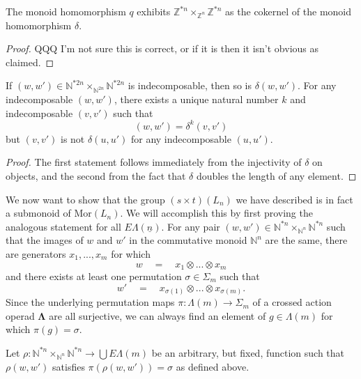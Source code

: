 \documentclass{amsbook} %
\newcommand{\ML}{\mathbf{\Lambda}}
\newcommand{\MorLn}{\mathrm{Mor}(L_n)}
\newcommand{\EL}{E\Lambda}
\newcommand{\ELn}{E\Lambda(\underline{n})}
\numberwithin{section}{chapter}
\begin{document}
\begin{lem}\label{monoid_coeq}
The monoid homomorphism $q$ exhibits $\mathbb{Z}^{\ast n} \times_{\mathbb{Z}^n} \mathbb{Z}^{\ast n}$ as the cokernel of the monoid homomorphism $\delta$.
\end{lem}
\begin{proof}
QQQ I'm not sure this is correct, or if it is then it isn't obvious as claimed.
\end{proof}

\begin{lem}\label{rho_lemmas}
If $(w,w') \in \mathbb{N}^{\ast 2n} \times_{\mathbb{N}^{2n}} \mathbb{N}^{\ast 2n}$ is indecomposable, then so is $\delta(w,w')$. For any indecomposable $(w,w')$, there exists a unique natural number $k$ and indecomposable $(v,v')$ such that
\[
(w,w') = \delta^k(v,v')
\]
but $(v,v')$ is not $\delta(u,u')$ for any indecomposable $(u,u')$.
\end{lem}
\begin{proof}
The first statement follows immediately from the injectivity of $\delta$ on objects, and the second from the fact that $\delta$ doubles the length of any element.
\end{proof}


We now want to show that the group $(s \times t)(L_n)$ we have described is in fact a submonoid of $\MorLn$.  We will accomplish this  by first proving the analogous statement for all $\ELn$.  For any pair $(w, w') \in \mathbb{N}^{\ast n} \times_{\mathbb{N}^n} \mathbb{N}^{\ast n}$ such that the images of $w$ and $w'$ in the commutative monoid $\mathbb{N}^n$ are the same, there are generators $x_1, ..., x_m$ for which 
\[ w \quad = \quad x_1 \otimes ... \otimes x_m \]
and there exists at least one permutation $\sigma \in \Sigma_m$ such that
\[ w' \quad = \quad x_{\sigma(1)} \otimes ... \otimes x_{\sigma(m)}. \]
Since the underlying permutation maps $\pi : \Lambda(m) \to \Sigma_m$ of a crossed action operad $\ML$ are all surjective, we can always find an element of $g \in \Lambda(m)$ for which $\pi(g) = \sigma$. 

\begin{nota}\label{rho_ww'}
Let $\rho:\mathbb{N}^{\ast n} \times_{\mathbb{N}^n} \mathbb{N}^{\ast n} \to \bigcup \EL(m)$ be an arbitrary, but fixed, function such that $\rho(w,w')$ satisfies $\pi(\rho(w,w')) = \sigma$ as defined above.
\end{nota}
\end{document}
